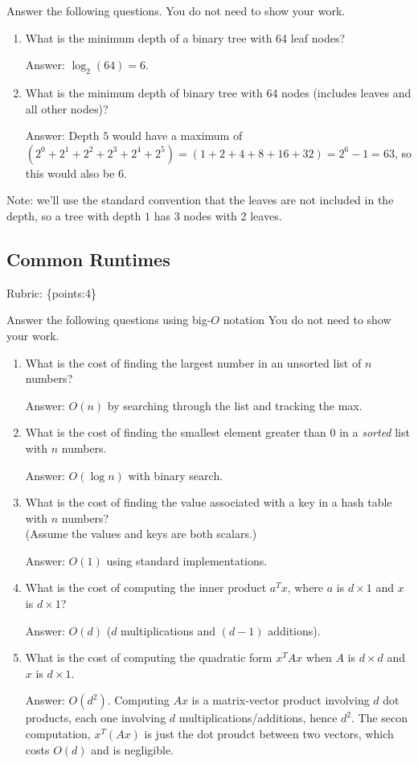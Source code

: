 \documentclass{article}
\def\ans#1{\par\gre{Answer: #1}}
\def\rubric#1{\gre{Rubric: \{#1\}}}{}
\def\blu#1{{\color{blu}#1}}
\def\gre#1{{\color{gre}#1}}
\begin{document}
	\blu{Answer the following questions.} You do not need to show your work.
	
	\begin{enumerate}
		\item What is the minimum depth of a binary tree with 64 leaf nodes?
		\ans{$\log_2(64) = 6$.}
		\item What is the minimum depth of binary tree with 64 nodes (includes leaves and all other nodes)?
		\ans{Depth $5$ would have a maximum of $(2^0+2^1+2^2+2^3+2^4+2^5) = (1+2+4+8+16+32) = 2^{6}-1 = 63$, so this would also be $6$.}
	\end{enumerate}
	Note: we'll use the standard convention that the leaves are not included in the depth, so a tree with depth $1$ has 3 nodes with 2 leaves.
	
	\subsection{Common Runtimes}
	\rubric{points:4}
	
	\blu{Answer the following questions using big-$O$ notation} You do not need to show your work.
	\begin{enumerate}
		\item What is the cost of finding the largest number in an unsorted list of $n$ numbers?
		\ans{$O(n)$ by searching through the list and tracking the max.}
		\item What is the cost of finding the smallest element greater than 0 in a \emph{sorted} list with $n$ numbers.
		\ans{$O(\log n)$ with binary search.}
		\item What is the cost of finding the value associated with a key in a hash table with $n$ numbers? \\(Assume the values and keys are both scalars.)
		\ans{$O(1)$ using standard implementations.}
		\item What is the cost of computing the inner product $a^Tx$, where $a$ is $d \times 1$ and $x$ is $d \times 1$?
		\ans{$O(d)$ ($d$ multiplications and $(d-1)$ additions).}
		\item What is the cost of computing the quadratic form $x^TAx$ when $A$ is $d \times d$ and $x$ is $d \times 1$.
		\ans{$O(d^2)$. Computing $Ax$ is a matrix-vector product involving $d$ dot products, each one involving $d$ multiplications/additions, hence $d^2$. The secon computation, $x^T(Ax)$ is just the dot proudct between two vectors, which costs $O(d)$ and is negligible.}
	\end{enumerate}
	
\end{document}
